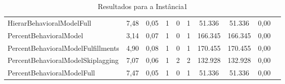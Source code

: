 \begin{table}[H]
{\begin{tabular}{lccccccccc}
            HierarBehavioralModelFull & 7,48 & 0,05 & 1 & 0 & 1 & 51.336 & 51.336 & 0,00 \\ 
            PercentBehavioralModel & 3,14 & 0,07 & 1 & 0 & 1 & 166.345 & 166.345 & 0,00 \\ 
            PercentBehavioralModelFulfillments & 4,90 & 0,08 & 1 & 0 & 1 & 170.455 & 170.455 & 0,00 \\ 
            PercentBehavioralModelSkiplagging & 7,07 & 0,06 & 1 & 2 & 2 & 132.928 & 132.928 & 0,00 \\ 
            PercentBehavioralModelFull & 7,47 & 0,05 & 1 & 0 & 1 & 51.336 & 51.336 & 0,00 \\ \hline
        \end{tabular}%
    }
    \caption{Resultados para a Instância1}
    \label{tab:resultado_instancia1}
\end{table}

